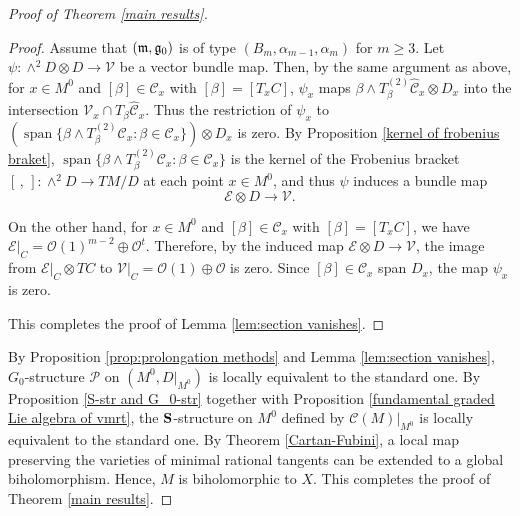 \documentclass[12pt]{amsart}
\theoremstyle{plain}
\theoremstyle{definition}
\def\span{\operatorname{span}}
\begin{document}
\begin{proof} [Proof of Theorem \ref{main results}]
\begin{proof}
Assume that $(\frak m, \frak g_0)$ is of type $(B_m, \alpha_{m-1}, \alpha_m )$ for $m \geq 3$. Let $\psi: \wedge ^2 D \otimes D \rightarrow \mathcal V$ be a vector bundle map.
Then, by the same argument as above, for  $x \in M^0$ and $[\beta] \in \mathcal C_x$ with $[\beta]=[T_xC]$, $\psi_x$ maps $\beta \wedge T^{(2)}_{\beta}\widehat{\mathcal C}_x \otimes D_x$ into the intersection $\mathcal V_x \cap T_{\beta}\widehat{\mathcal C}_x$.
 Thus the restriction of $\psi_x$ to $(\span \{\beta \wedge T_{\beta}^{(2)}\mathcal C_x : \beta \in \mathcal C_x\})\otimes D_x$ is zero.
By Proposition \ref{kernel of frobenius braket}, $\span \{\beta \wedge T_{\beta}^{(2)}\mathcal C_x: \beta \in \mathcal C_x\}$ is the kernel of the Frobenius bracket $[\,,\,]:\wedge ^2D \rightarrow TM/D$ at each point $x\in M^0$, and thus $\psi $ induces a bundle map
$$\mathcal E \otimes D \rightarrow \mathcal V.$$

On the other hand,
for  $x \in M^0$ and $[\beta] \in \mathcal C_x$ with $[\beta] = [T_xC]$, we have $\mathcal E|_C =\mathcal O(1)^{m-2} \oplus \mathcal O^t$. Therefore, by the induced map $\mathcal E \otimes D \rightarrow \mathcal V$, the image from $\mathcal E|_C \otimes TC$ to $\mathcal V|_C=\mathcal O(1) \oplus \mathcal O$ is zero. Since $[\beta] \in \mathcal C_x$ span $D_x$, the map $\psi_x$ is zero.

This completes the proof of Lemma \ref{lem:section vanishes}.
 \end{proof}

By Proposition \ref{prop:prolongation methods} and  Lemma \ref{lem:section vanishes}, $G_0$-structure $\mathscr P$  on $(M^0, D|_{M^0})$ is locally equivalent to the standard one. By Proposition \ref{S-str and G_0-str} together with  Proposition \ref{fundamental graded Lie algebra of vmrt}, the ${\bf S}$-structure on $M^0$ defined by $\mathcal C(M)|_{M^0}$ is locally equivalent to the standard one. By Theorem \ref{Cartan-Fubini},  a local map preserving the varieties of minimal rational tangents can be extended to a global biholomorphism. Hence, $M$ is biholomorphic to $X$.
This completes the proof of Theorem \ref{main results}.
\end{proof}
\end{document}
